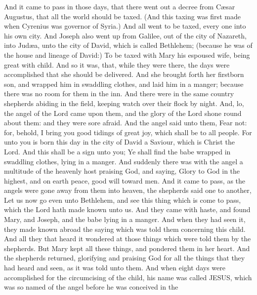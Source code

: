  And it came to pass in those days, that there went out a
decree from Cæsar Augustus, that all the world should be taxed.
 (And this taxing was first made when Cyrenius was
governor of Syria.)  And all went to be taxed, every one
into his own city.  And Joseph also went up from Galilee,
out of the city of Nazareth, into Judæa, unto the city of David, which
is called Bethlehem; (because he was of the house and lineage of David:)
 To be taxed with Mary his espoused wife, being great with
child.  And so it was, that, while they were there, the
days were accomplished that she should be delivered.  And
she brought forth her firstborn son, and wrapped him in swaddling
clothes, and laid him in a manger; because there was no room for them in
the inn.  And there were in the same country shepherds
abiding in the field, keeping watch over their flock by night.
 And, lo, the angel of the Lord came upon them, and the
glory of the Lord shone round about them: and they were sore afraid.
 And the angel said unto them, Fear not: for, behold, I
bring you good tidings of great joy, which shall be to all people.
 For unto you is born this day in the city of David a
Saviour, which is Christ the Lord.  And this shall be a
sign unto you; Ye shall find the babe wrapped in swaddling clothes,
lying in a manger.  And suddenly there was with the angel
a multitude of the heavenly host praising God, and saying,
 Glory to God in the highest, and on earth peace, good
will toward men.  And it came to pass, as the angels were
gone away from them into heaven, the shepherds said one to another, Let
us now go even unto Bethlehem, and see this thing which is come to pass,
which the Lord hath made known unto us.  And they came
with haste, and found Mary, and Joseph, and the babe lying in a manger.
 And when they had seen it, they made known abroad the
saying which was told them concerning this child.  And
all they that heard it wondered at those things which were told them by
the shepherds.  But Mary kept all these things, and
pondered them in her heart.  And the shepherds returned,
glorifying and praising God for all the things that they had heard and
seen, as it was told unto them.  And when eight days were
accomplished for the circumcising of the child, his name was called
JESUS, which was so named of the angel before he was conceived in the
